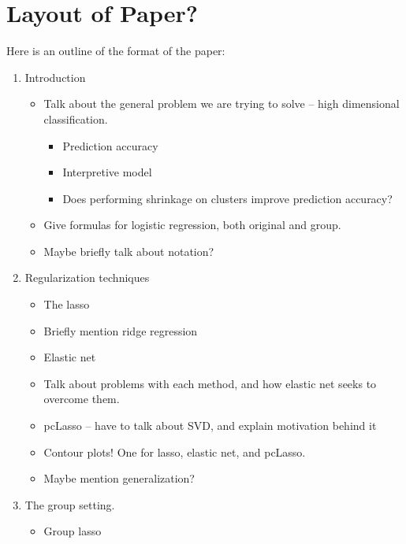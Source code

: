 \documentclass[10pt]{article}
\begin{document}




\section{Layout of Paper?}

Here is an outline of the format of the paper:
\begin{enumerate}
    \item Introduction
    \begin{itemize}
        \item Talk about the general problem we are trying to solve -- high dimensional classification. 
        \begin{itemize}
            \item Prediction accuracy
            \item Interpretive model
            \item Does performing shrinkage on clusters improve prediction accuracy?
        \end{itemize}
        \item Give formulas for logistic regression, both original and group.
        \item Maybe briefly talk about notation?
    \end{itemize}
    \item Regularization techniques
    \begin{itemize}
        \item The lasso
        \item Briefly mention ridge regression
        \item Elastic net
        \item Talk about problems with each method, and how elastic net seeks to overcome them. 
        \item pcLasso -- have to talk about SVD, and explain motivation behind it
        \item Contour plots! One for lasso, elastic net, and pcLasso.
        \item Maybe mention generalization?
    \end{itemize}
    \item The group setting.
    \begin{itemize}
        \item Group lasso

\end{itemize}
\end{enumerate}
\end{document}
